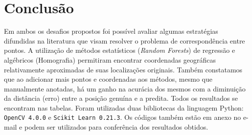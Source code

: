 \documentclass[12pt]{report}
\begin{document}
{\section*{Conclusão} 

Em ambos os desafios propostos foi possível avaliar algumas estratégias difundidas na literatura que visam resolver o problema de correspondência entre pontos.
A utilização de métodos estatísticos (\textit{Random Forests}) de regressão e algébricos (Homografia) permitiram encontrar coordenadas geográficas relativamente aproximadas de suas localizações originais.
Também constatamos que ao adicionar mais pontos e coordenadas aos métodos, mesmo que manualmente anotadas, há um ganho na acurácia dos mesmos com a diminuição da distância (erro) entre a posição genuína e a predita.
Todos os resultados se encontram nas tabelas.
Foram utilizadas duas bibliotecas da linguagem Python: \texttt{OpenCV 4.0.0} e \texttt{Scikit Learn 0.21.3}.
Os códigos também estão em anexo no e-mail e podem ser utilizados para conferência dos resultados obtidos.






}
\end{document}
